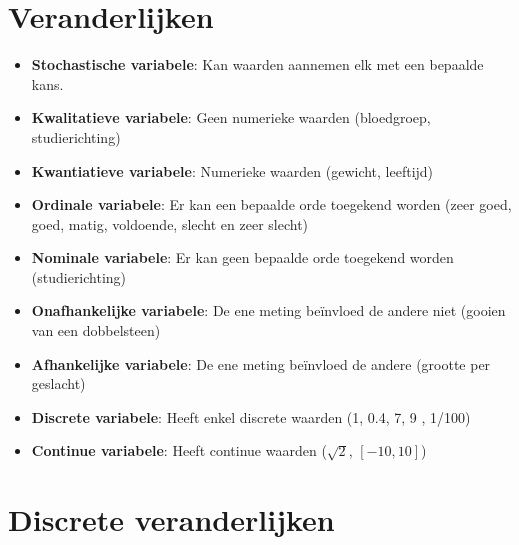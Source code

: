 \documentclass[12pt]{report}
\begin{document}
\section{Veranderlijken}
\begin{itemize}
	\item {\textbf{Stochastische variabele}: Kan waarden aannemen elk met een bepaalde kans.}
	\item {\textbf{Kwalitatieve variabele}: Geen numerieke waarden (bloedgroep, studierichting)}
	\item {\textbf{Kwantiatieve variabele}: Numerieke waarden (gewicht, leeftijd)}
	\item {\textbf{Ordinale variabele}: Er kan een bepaalde orde toegekend worden (zeer goed, goed, matig, voldoende, slecht en zeer slecht)}
	\item {\textbf{Nominale variabele}: Er kan geen bepaalde orde toegekend worden (studierichting)}
	\item {\textbf{Onafhankelijke variabele}: De ene meting beïnvloed de andere niet (gooien van een dobbelsteen)}
	\item {\textbf{Afhankelijke variabele}: De ene meting beïnvloed de andere (grootte per geslacht)}
	\item {\textbf{Discrete variabele}: Heeft enkel discrete waarden (1, 0.4, 7, 9 , 1/100)}
	\item {\textbf{Continue variabele}: Heeft continue waarden ($\sqrt{2}$, $[-10, 10]$)}
\end{itemize}
\section{Discrete veranderlijken}
\end{document}

